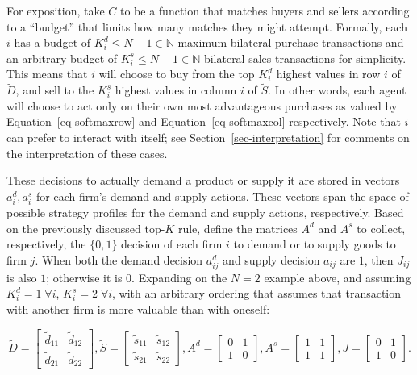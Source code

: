 \documentclass[
]{article}
\theoremstyle{definition}
\theoremstyle{plain}
\theoremstyle{remark}
\begin{document}
For exposition, take \(C\) to be a function that matches buyers and
sellers according to a ``budget'' that limits how many matches they
might attempt. Formally, each \(i\) has a budget of
\(K_i^d \leq N-1 \in \mathbb{N}\) maximum bilateral purchase
transactions and an arbitrary budget of
\(K_i^s \leq N-1 \in \mathbb{N}\) bilateral sales transactions for
simplicity. This means that \(i\) will choose to buy from the top
\(K_i^d\) highest values in row \(i\) of \(\tilde{D}\), and sell to the
\(K_i^s\) highest values in column \(i\) of \(\tilde{S}\). In other
words, each agent will choose to act only on their own most advantageous
purchases as valued by Equation~\ref{eq-softmaxrow} and
Equation~\ref{eq-softmaxcol} respectively. Note that \(i\) can prefer to
interact with itself; see Section~\ref{sec-interpretation} for comments
on the interpretation of these cases.

These decisions to actually demand a product or supply it are stored in
vectors \(a_i^d, a_i^s\) for each firm's demand and supply actions.
These vectors span the space of possible strategy profiles for the
demand and supply actions, respectively. Based on the previously
discussed top-\(K\) rule, define the matrices \(A^d\) and \(A^s\) to
collect, respectively, the \(\{0, 1\}\) decision of each firm \(i\) to
demand or to supply goods to firm \(j\). When both the demand decision
\(a_{ij}^d\) and supply decision \(a_{ij}\) are \(1\), then \(J_{ij}\)
is also \(1\); otherwise it is \(0\). Expanding on the \(N=2\) example
above, and assuming \(K_i^d=1 \; \forall i\), \(K_i^s=2 \; \forall i\),
with an arbitrary ordering that assumes that transaction with another
firm is more valuable than with oneself:

\[
\tilde{D} = 
\begin{bmatrix}
\tilde{d}_{11} & \tilde{d}_{12} \\
\tilde{d}_{21} & \tilde{d}_{22}
\end{bmatrix}
,
\tilde{S} = 
\begin{bmatrix}
\tilde{s}_{11} & \tilde{s}_{12} \\
\tilde{s}_{21} & \tilde{s}_{22}
\end{bmatrix}
,
A^d = 
\begin{bmatrix}
0 & 1 \\
1 & 0
\end{bmatrix}
,
A^s = 
\begin{bmatrix}
1 & 1 \\
1 & 1
\end{bmatrix}
,
J = 
\begin{bmatrix}
0 & 1 \\
1 & 0
\end{bmatrix}.
\]
\end{document}
